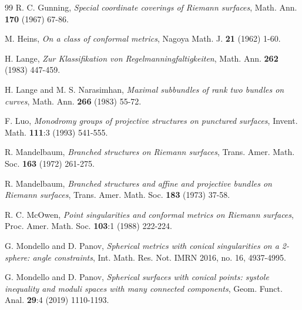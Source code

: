 \documentclass[12pt]{article}
\begin{document}
\begin{thebibliography}{99}
   R. C. Gunning, \emph{Special coordinate coverings of Riemann surfaces}, Math. Ann. {\bf 170} (1967) 67-86.



   M. Heins, \emph{On a class of conformal metrics}, Nagoya Math. J. {\bf 21} (1962) 1-60.


   H. Lange,  \emph{Zur Klassifikation von Regelmanningfaltigkeiten}, Math. Ann. {\bf 262}
(1983) 447-459.

   H. Lange and M. S. Narasimhan, \emph{Maximal subbundles of rank two bundles on curves}, Math. Ann. {\bf 266} (1983) 55-72.

   F. Luo, \emph{Monodromy groups of projective structures on punctured surfaces}, Invent. Math. {\bf 111}:3 (1993) 541-555.


   R. Mandelbaum, \emph{Branched structures on Riemann surfaces}, Trans. Amer. Math. Soc. {\bf 163} (1972) 261-275.

   R. Mandelbaum, \emph{Branched structures and affine and projective bundles on Riemann surfaces}, Trans. Amer. Math. Soc. {\bf 183} (1973) 37-58.

   R. C. McOwen, \emph{Point singularities and conformal metrics on Riemann surfaces}, Proc. Amer. Math. Soc. {\bf 103}:1 (1988) 222-224.

   G. Mondello and D. Panov, \emph{Spherical metrics with conical singularities on a 2-sphere: angle constraints}, Int. Math. Res. Not. IMRN 2016, no. 16, 4937-4995.

    G. Mondello and D. Panov, \emph{Spherical surfaces with conical points: systole inequality and moduli spaces with many connected components}, Geom. Funct. Anal.  {\bf 29}:4 (2019) 1110-1193.


\end{thebibliography}
\end{document}

